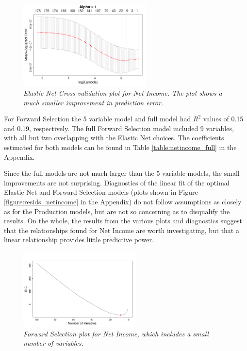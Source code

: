 \documentclass{article}
\begin{document}
\begin{figure}
\vspace*{-0.5cm}
\includegraphics[width=0.6\textwidth]{elastic_cv_netincome.pdf}
\setlength{\belowcaptionskip}{-10pt}
\caption{\textsl{\small Elastic Net Cross-validation plot for Net Income. The plot shows a much smaller improvement in prediction error.}}
\label{figure:netincome_opt_e}
\end{figure}

For Forward Selection the 5 variable model and full model had $R^2$ values of 0.15 and 0.19, respectively. The full Forward 
Selection model included 9 variables, with all but two overlapping with the Elastic Net choices. The coefficients estimated for 
both models can be found in Table \ref{table:netincome_full} in the Appendix. 

Since the full models are not much larger than the 5 variable models, the small improvements are not surprising. Diagnostics of 
the linear fit of the optimal Elastic Net and Forward Selection models (plots shown in Figure 
\ref{figure:resids_netincome} in the Appendix) do not follow assumptions as closely as for the Production models, but are not so 
concerning as to disqualify the results. On the whole, the results from the various plots and diagnostics suggest that the 
relationships found for Net Income are worth investigating, but that a linear relationship provides little predictive power.

\begin{figure}[h!]
\centering
\includegraphics[width=0.55\textwidth]{forward_nvars_netincome.pdf}
\setlength{\belowcaptionskip}{-10pt}
\caption{\textsl{\small Forward Selection plot for Net Income, which includes a small number of variables.}}
\label{figure:netincome_opt_f}
\end{figure}
\end{document}
